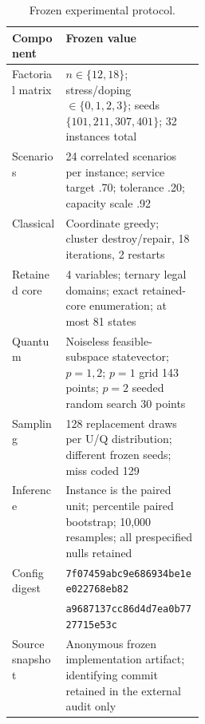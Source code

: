 \begin{table}[h]
\centering
\caption{Frozen experimental protocol.}
\label{tab:protocol}
\small
\begin{tabularx}{\linewidth}{@{}p{0.28\linewidth}X@{}}
\toprule
Component & Frozen value \\
\midrule
Factorial matrix & $n\in\{12,18\}$; stress/doping $\in\{0,1,2,3\}$; seeds $\{101,211,307,401\}$; 32 instances total \\
Scenarios & 24 correlated scenarios per instance; service target .70; tolerance .20; capacity scale .92 \\
Classical & Coordinate greedy; cluster destroy/repair, 18 iterations, 2 restarts \\
Retained core & 4 variables; ternary legal domains; exact retained-core enumeration; at most 81 states \\
Quantum & Noiseless feasible-subspace statevector; $p=1,2$; $p=1$ grid 143 points; $p=2$ seeded random search 30 points \\
Sampling & 128 replacement draws per U/Q distribution; different frozen seeds; miss coded 129 \\
Inference & Instance is the paired unit; percentile paired bootstrap; 10,000 resamples; all prespecified nulls retained \\
Config digest & \texttt{7f07459abc9e686934be1ee022768eb82}\\[-1mm]
& \texttt{a9687137cc86d4d7ea0b7727715e53c} \\
Source snapshot & Anonymous frozen implementation artifact; identifying commit retained in the external audit only \\
\bottomrule
\end{tabularx}
\end{table}
